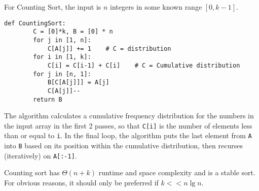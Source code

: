 \documentclass[11pt]{article}
\begin{document}
For Counting Sort, the input is $n$ integers in some known range $[0, k-1]$.

\begin{lstlisting}[autogobble=true]
	def CountingSort:
		C = [0]*k, B = [0] * n
		for j in [1, n]:
			C[A[j]] += 1	# C = distribution
		for i in [1, k]:
			C[i] = C[i-1] + C[i]	# C = Cumulative distribution
		for j in [n, 1]:
			B[C[A[j]]] = A[j]
			C[A[j]]--
		return B
\end{lstlisting}

The algorithm calculates a cumulative frequency distribution for the numbers in the input array in the first 2 passes, so that \verb|C[i]| is the number of elements less than or equal to \verb|i|. In the final loop, the algorithm puts the last element from \verb|A| into \verb|B| based on its position within the cumulative distribution, then recurses (iteratively) on \verb|A[:-1]|.

Counting sort has $\Theta(n + k)$ runtime and space complexity and is a stable sort. For obvious reasons, it should only be preferred if $k << n\lg n$.

%		
%		


\end{document}
